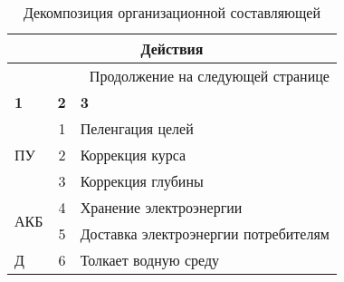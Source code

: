 \begin{longtable}{|l|r|m{}|}
  \caption{Декомпозиция организационной составляющей}\label{tbl:model_anpa_actions}\\
  \toprule
  \multicolumn{3}{|c|}{\textbf{Действия}} \\
  \midrule
  \endhead
  \midrule
  \multicolumn{3}{r}{Продолжение на следующей странице} \\
  \midrule
  \endfoot
  \bottomrule
  \endlastfoot
  \textbf{1} & \textbf{2} & \textbf{3} \\\hline
  \multirow{3}{.25\textwidth}{ПУ} & 1 & Пеленгация целей \\\cline{2-3}
                                  & 2 & Коррекция курса \\\cline{2-3}
                                  & 3 & Коррекция глубины \\\hline
  \multirow{2}{.25\textwidth}{АКБ} & 4 & Хранение электроэнергии \\\cline{2-3}
                                   & 5 & Доставка электроэнергии потребителям \\\hline
                                  Д & 6 & Толкает водную среду \\
\end{longtable}
      